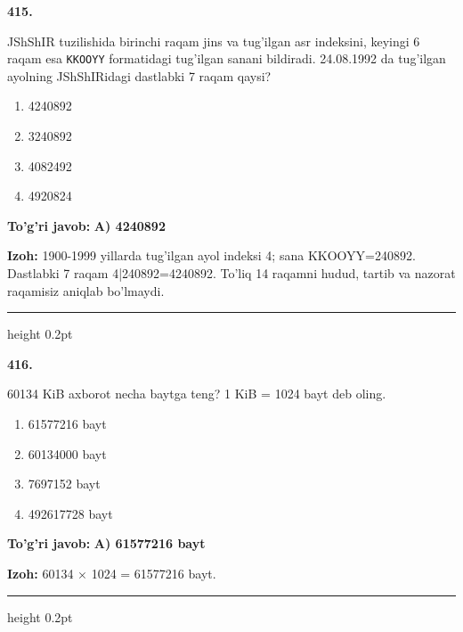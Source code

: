 \documentclass[10pt,a4paper,oneside]{article}
\begin{document}
\noindent\textbf{\color{ink}415.}
\par
JShShIR tuzilishida birinchi raqam jins va tug'ilgan asr indeksini, keyingi 6 raqam esa \texttt{KKOOYY} formatidagi tug'ilgan sanani bildiradi. 24.08.1992 da tug'ilgan ayolning JShShIRidagi dastlabki 7 raqam qaysi?
\begin{enumerate}[label=\Alph*),leftmargin=9mm]
\item 4240892
\item 3240892
\item 4082492
\item 4920824
\end{enumerate}
\begin{tcolorbox}[enhanced,breakable,colback=teal!4,colframe=teal!50!black,boxrule=0.5pt,arc=1.1mm,left=3mm,right=3mm,top=1.7mm,bottom=1.7mm,before skip=2mm,after skip=2mm]
\textbf{\color{teal}To'g'ri javob:} \textbf{A) 4240892}
\par\smallskip
\textbf{Izoh:} 1900-1999 yillarda tug'ilgan ayol indeksi 4; sana KKOOYY=240892. Dastlabki 7 raqam 4|240892=4240892. To'liq 14 raqamni hudud, tartib va nazorat raqamisiz aniqlab bo'lmaydi.
\end{tcolorbox}
\vspace{2mm}\hrule height 0.2pt \vspace{3mm}

\noindent\textbf{\color{ink}416.}
\par
60134 KiB axborot necha baytga teng? 1 KiB = 1024 bayt deb oling.
\begin{enumerate}[label=\Alph*),leftmargin=9mm]
\item 61577216 bayt
\item 60134000 bayt
\item 7697152 bayt
\item 492617728 bayt
\end{enumerate}
\begin{tcolorbox}[enhanced,breakable,colback=teal!4,colframe=teal!50!black,boxrule=0.5pt,arc=1.1mm,left=3mm,right=3mm,top=1.7mm,bottom=1.7mm,before skip=2mm,after skip=2mm]
\textbf{\color{teal}To'g'ri javob:} \textbf{A) 61577216 bayt}
\par\smallskip
\textbf{Izoh:} 60134 \ensuremath{\times} 1024 = 61577216 bayt.
\end{tcolorbox}
\vspace{2mm}\hrule height 0.2pt \vspace{3mm}
\end{document}
